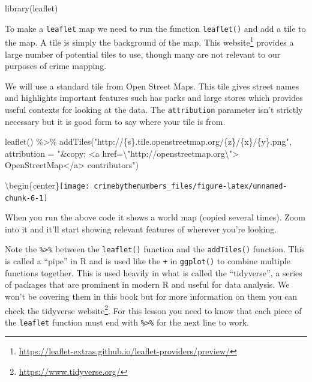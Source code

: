 \documentclass[
]{krantz}
\makeatletter
\newenvironment{Shaded}{\begin{snugshade}}{\end{snugshade}}
\newcommand{\AttributeTok}[1]{\textcolor[rgb]{0.61,0.61,0.61}{#1}}
\newcommand{\FunctionTok}[1]{\textcolor[rgb]{0,0,0}{#1}}
\newcommand{\NormalTok}[1]{#1}
\newcommand{\SpecialCharTok}[1]{\textcolor[rgb]{0,0,0}{#1}}
\newcommand{\StringTok}[1]{\textcolor[rgb]{0.5,0.5,0.5}{#1}}
\renewcommand{\href}[2]{#2\footnote{\url{#1}}}
\newenvironment{kframe}{%
\medskip{}
\setlength{\fboxsep}{.8em}
 \def\at@end@of@kframe{}%
 \ifinner\ifhmode%
  \def\at@end@of@kframe{\end{minipage}}%
  \begin{minipage}{\columnwidth}%
 \fi\fi%
 \def\FrameCommand##1{\hskip\@totalleftmargin \hskip-\fboxsep
 \colorbox{shadecolor}{##1}\hskip-\fboxsep
     \hskip-\linewidth \hskip-\@totalleftmargin \hskip\columnwidth}%
 \MakeFramed {\advance\hsize-\width
   \@totalleftmargin\z@ \linewidth\hsize
   \@setminipage}}%
 {\par\unskip\endMakeFramed%
 \at@end@of@kframe}
\renewenvironment{Shaded}{\begin{kframe}}{\end{kframe}}
\makeatother
\begin{document}
\begin{Shaded}
\begin{Highlighting}[]
\FunctionTok{library}\NormalTok{(leaflet)}
\end{Highlighting}
\end{Shaded}

To make a \texttt{leaflet} map we need to run the function \texttt{leaflet()} and add a tile to the map. A tile is simply the background of the map. This \href{https://leaflet-extras.github.io/leaflet-providers/preview/}{website} provides a large number of potential tiles to use, though many are not relevant to our purposes of crime mapping.

We will use a standard tile from Open Street Maps. This tile gives street names and highlights important features such has parks and large stores which provides useful contexts for looking at the data. The \texttt{attribution} parameter isn't strictly necessary but it is good form to say where your tile is from.

\begin{Shaded}
\begin{Highlighting}[]
\FunctionTok{leaflet}\NormalTok{() }\SpecialCharTok{\%\textgreater{}\%}
  \FunctionTok{addTiles}\NormalTok{(}\StringTok{"http://\{s\}.tile.openstreetmap.org/\{z\}/\{x\}/\{y\}.png"}\NormalTok{,}
    \AttributeTok{attribution =} \StringTok{"\&copy; \textless{}a href=}\SpecialCharTok{\textbackslash{}"}\StringTok{http://openstreetmap.org}\SpecialCharTok{\textbackslash{}"}\StringTok{\textgreater{}}
\StringTok{                OpenStreetMap\textless{}/a\textgreater{} contributors"}\NormalTok{)}
\end{Highlighting}
\end{Shaded}

\textbackslash begin\{center\}\texttt{[image: crimebythenumbers\_files/figure-latex/unnamed-chunk-6-1]}

When you run the above code it shows a world map (copied several times). Zoom into it and it'll start showing relevant features of wherever you're looking.

Note the \texttt{\%\textgreater{}\%} between the \texttt{leaflet()} function and the \texttt{addTiles()} function. This is called a ``pipe'' in R and is used like the \texttt{+} in \texttt{ggplot()} to combine multiple functions together. This is used heavily in what is called the ``tidyverse'', a series of packages that are prominent in modern R and useful for data analysis. We won't be covering them in this book but for more information on them you can check the \href{https://www.tidyverse.org/}{tidyverse website}. For this lesson you need to know that each piece of the \texttt{leaflet} function must end with \texttt{\%\textgreater{}\%} for the next line to work.
\end{document}
